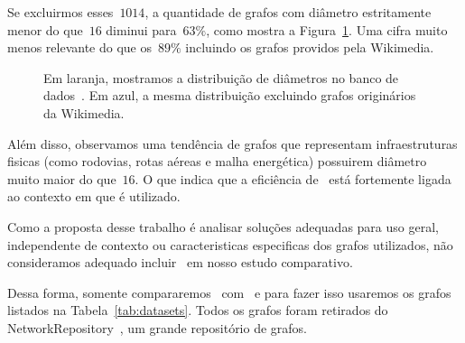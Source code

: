 Se excluirmos esses~$1014$, a quantidade de grafos com diâmetro estritamente menor do que~$16$ diminui para~$63\%$, como mostra a Figura~\ref{fig:distdiametro}.
Uma cifra muito menos relevante do que os~$89\%$ incluindo os grafos providos pela Wikimedia.

\begin{figure}
\begin{center}
\caption{Em laranja, mostramos a distribuição de diâmetros no banco de dados~\cite{KONECT}. Em azul, a mesma distribuição excluindo grafos originários da Wikimedia.}
\label{fig:distdiametro}
\end{center}
\end{figure}

Além disso, observamos uma tendência de grafos que representam infraestruturas fisicas (como rodovias, rotas aéreas e malha energética) possuirem diâmetro muito maior do que~$16$.
O que indica que a eficiência de~\CLHB{} está fortemente ligada ao contexto em que é utilizado. 

Como a proposta desse trabalho é analisar soluções adequadas para uso geral, independente de contexto ou caracteristicas especificas dos grafos utilizados, não consideramos adequado incluir~\CLHB{} em nosso estudo comparativo.


Dessa forma, somente compararemos~\HK{} com~\HDT{} e para fazer isso usaremos os grafos listados na Tabela~\ref{tab:datasets}.
Todos os grafos foram retirados do NetworkRepository~\cite{nr-aaai15}, um grande repositório de grafos.


